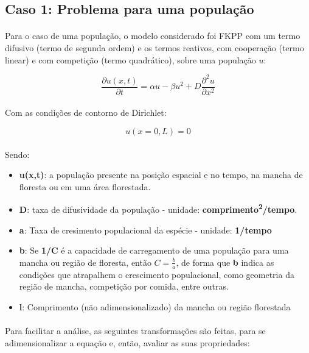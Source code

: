 \documentclass{article}
\begin{document}
	\subsection{Caso 1: Problema para uma população}
	
	\paragraph{}
	Para o caso de uma população, o modelo considerado foi FKPP com um termo difusivo (termo de segunda ordem) e os termos reativos, com cooperação (termo linear) e com competição (termo quadrático), sobre uma população $u$:
	
	$$ \frac{\partial u(x,t)}{\partial t} = \alpha u - \beta u^2 + D \frac{\partial^2 u}{\partial x^2}  $$
	
	\paragraph{}
	Com as condições de contorno de Dirichlet:
	
	$$u(x=0,L) = 0 $$
	
	\paragraph{}
	Sendo:
	
	\begin{itemize}
		\item \textbf{u(x,t)}: a população presente na posição espacial e no tempo, na mancha de floresta ou em uma área florestada.
		\item \textbf{D}: taxa de difusividade da população - unidade: \textbf{comprimento\textsuperscript{2}/tempo}.
		\item \textbf{a}: Taxa de cresimento populacional da espécie - unidade: \textbf{1/tempo}
		\item \textbf{b}: Se \textbf{1/C} é a capacidade de carregamento de uma população para uma mancha ou região de floresta, então $C=\frac{b}{a}$, de forma que \textbf{b} indica as condições que atrapalhem o crescimento populacional, como geometria da região de mancha, competição por comida, entre outras.
		\item \textbf{l}: Comprimento (não adimensionalizado) da mancha ou região florestada
	\end{itemize}
	
	\paragraph{}
	Para facilitar a análise, as seguintes transformações são feitas, para se adimensionalizar a equação e, então, avaliar as suas propriedades:
	
\end{document}
